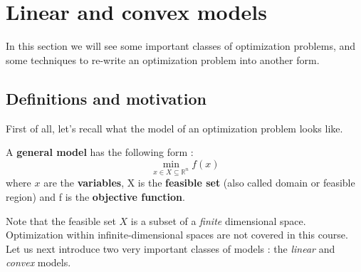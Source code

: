 %
%
%
%
%
%
%
%

\section{Linear and convex models}
In this section we will see some important classes of optimization problems, and some techniques to re-write an optimization problem into another form.

\subsection{Definitions and motivation}
First of all, let's recall what the model of an optimization problem looks like.\\

\begin{definition}
A \textbf{general model} has the following form :
\begin{equation}
\min_{x \in X \subseteq \mathbb{R}^n} f(x)
\end{equation}
where $x$ are the \textbf{variables}, X is the \textbf{feasible set} (also called domain or feasible region) and f is the \textbf{objective function}.
\end{definition}

Note that the feasible set $X$ is a subset of a \textit{finite} dimensional space. Optimization within infinite-dimensional spaces are not covered in this course.\\

Let us next introduce two very important classes of models : the \textit{linear} and \textit{convex} models.\\

